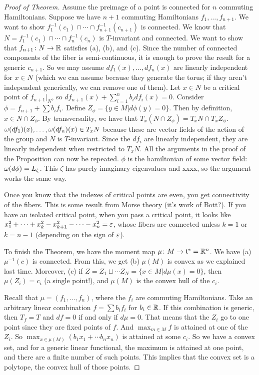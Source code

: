 \begin{proof}[Proof of Theorem]
 Assume the preimage of a point is connected for $n$ commuting Hamiltonians. Suppose we have $n+1$ commuting Hamiltonians $f_1,\dots, f_{n+1}$. We want to show $f_1^{-1}(c_1)\cap \cdots\cap f_{n+1}^{-1}(c_{n+1})$ is connected. We know that $N=f_1^{-1}(c_1)\cap \cdots\cap f_n^{-1}(c_n)$ is $T$-invariant and connected. We want to show that $f_{n+1}\colon N\to \mathbb{R}$ satisfies (a), (b), and (c). Since the number of connected components of the fiber is semi-continuous, it is enough to prove the result for a generic $c_{n+1}$. So we may assume $df_1(x),\dots, df_n(x)$ are linearly independent for $x\in N$ (which we can assume because they generate the torus; if they aren't independent generically, we can remove one of them). Let $x\in N$ be a critical point of $f_{n+1}|_N$, so $df_{n+1}(x)+\sum_{i=1}^n b_i df_i(x)=0$. Consider $\phi=f_{n+1}+\sum b_i f_i$. Define $Z_\phi = \{y\in M| d\phi(y)=0\}$. Then by definition, $x\in N\cap Z_\phi$. By transversality, we have that $T_x(N\cap Z_\phi)=T_x N\cap T_xZ_\phi$. $\omega(df_1)(x),\dots, \omega(df_n)(x)\in T_xN$ because these are vector fields of the action of the group and $N$ is $T$-invariant. Since the $df_i$ are linearly independent, they are linearly independent when restricted to $T_xN$. All the arguments in the proof of the Proposition can now be repeated. $\phi$ is the hamiltonian of some vector field: $\omega(d\phi)=L_\zeta$. This $\zeta$ has purely imaginary eigenvalues and xxxx, so the argument works the same way.

 Once you know that the indexes of critical points are even, you get connectivity of the fibers. This is some result from Morse theory (it's work of Bott?). If you have an isolated critical point, when you pass a critical point, it looks like $x_1^2+\cdots +x_k^2-x_{k+1}^2-\cdots -x_n^2=\varepsilon$, whose fibers are connected unless $k=1$ or $k=n-1$ (depending on the sign of $\varepsilon$).

 To finish the Theorem, we have the moment map $\mu\colon M\to \mathfrak{t}^*=\mathbb{R}^n$. We have (a) $\mu^{-1}(c)$ is connected. From this, we get (b) $\mu(M)$ is convex as we explained last time. Moreover, (c) if $Z=Z_1\sqcup \cdots Z_N=\{x\in M|d\mu(x)=0\}$, then $\mu(Z_i)=c_i$ (a single point!), and $\mu(M)$ is the convex hull of the $c_i$.
 
 Recall that $\mu=(f_1,\dots, f_n)$, where the $f_i$ are commuting Hamiltonians. Take an arbitrary linear combination $f=\sum b_i f_i$ for $b_i\in \mathbb{R}$. If this combination is generic, then $T_f=T$ and $df=0$ if and only if $d\mu=0$. That means that the $Z_i$ go to one point since they are fixed points of $f$. And $\max_{m\in M}f$ is attained at one of the $Z_i$. So $\max_{x\in \mu(M)} (b_1x_1+\cdots b_nx_n)$ is attained at some $c_i$. So we have a convex set, and for a generic linear functional, the maximum is attained at one point, and there are a finite number of such points. This implies that the convex set is a polytope, the convex hull of those points.
\end{proof}
